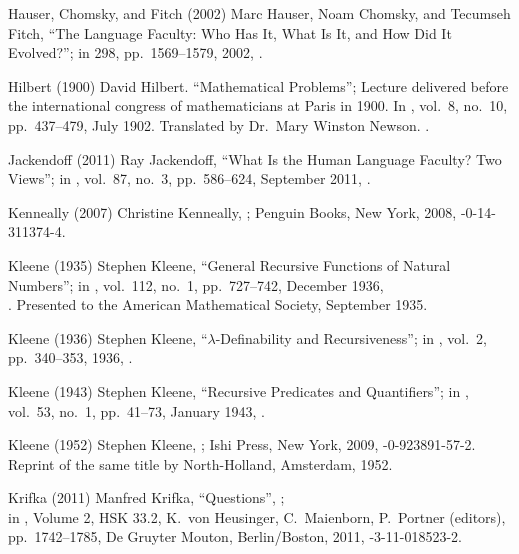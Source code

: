  Hauser, Chomsky, and Fitch (2002)
Marc Hauser, Noam Chomsky, and Tecumseh Fitch,
``The Language Faculty:
 Who Has It, What Is It, and How Did It Evolved?'';
in  298, pp.\ 1569--1579, 2002,
.

 Hilbert (1900)
David Hilbert.
``Mathematical Problems'';
Lecture delivered before the international
congress of mathematicians at Paris in 1900.
In ,
vol.\ 8, no.\ 10, pp.\ 437--479, July 1902.
Translated by Dr.\ Mary Winston Newson.
.

 Jackendoff (2011)
Ray Jackendoff,
``What Is the Human Language Faculty? Two Views'';
in ,
vol.\ 87, no.\ 3, pp.\ 586--624, September 2011,
.

 Kenneally (2007)
Christine Kenneally,
;
Penguin Books, New York, 2008,
-0-14-311374-4.

 Kleene (1935)
Stephen Kleene,
``General Recursive Functions of Natural Numbers'';
in ,
vol.\ 112, no.\ 1, pp.\ 727--742, December 1936,\\
.
Presented to the American Mathematical Society,
September 1935.

 Kleene (1936)
Stephen Kleene,
``$\lambda$-Definability and Recursiveness'';
in ,
vol.\ 2, pp.\ 340--353, 1936,
.

 Kleene (1943)
Stephen Kleene,
``Recursive Predicates and Quantifiers'';
in ,
vol.\ 53, no.\ 1, pp.\ 41--73, January 1943,
.

 Kleene (1952)
Stephen Kleene,
;
Ishi Press, New York, 2009,
-0-923891-57-2.
Reprint of the same title by
North-Holland, Amsterdam, 1952.

 Krifka (2011)
Manfred Krifka,
``Questions'',
;\\
in ,
 Volume 2, HSK 33.2,
 K.\ von Heusinger, C.\ Maienborn, P.\ Portner (editors),
pp.\ 1742--1785,
De Gruyter Mouton, Berlin/Boston, 2011,
-3-11-018523-2.

